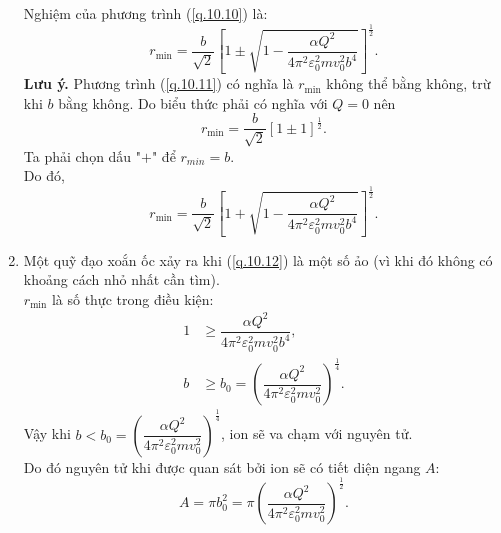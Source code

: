 \begin{loigiai}
\begin{enumerate}[1)]
    Nghiệm của phương trình (\ref{q.10.10}) là:
    \[r_{\min } = \dfrac{b}{\sqrt{2}}\left[1 \pm \sqrt{1-\dfrac{\alpha Q^{2}}{4 \pi^{2} \varepsilon_{0}^{2} m v_{0}^{2} b^{4}}}\right]^{\textstyle\frac{1}{2}}. \tag{11}\label{q.10.11}\]
    \textbf{Lưu ý.} Phương trình (\ref{q.10.11}) có nghĩa là $r_{\min}$ không thể bằng không, trừ khi $b$ bằng không.
    Do biểu thức phải có nghĩa với $Q = 0$ nên
    \[r_{\min }=\dfrac{b}{\sqrt{2}}[1 \pm 1]^{\textstyle\frac{1}{2}}.\]
    Ta phải chọn dấu "$+$" để $r_{min} = b$.\\
    Do đó,
    \[r_{\min} = \dfrac{b}{\sqrt{2}}\left[1+\sqrt{1-\dfrac{\alpha Q^{2}}{4 \pi^{2} \varepsilon_{0}^{2} m v_{0}^{2} b^{4}}}\right]^{\textstyle\frac{1}{2}}. \tag{12}\label{q.10.12} \]
    \item Một quỹ đạo xoắn ốc xảy ra khi (\ref{q.10.12}) là một số ảo (vì khi đó không có khoảng cách nhỏ nhất cần tìm).\\
    $r_{\min}$ là số thực trong điều kiện:
    \[\begin{aligned}
    1 &\geq \dfrac{\alpha Q^{2}}{4 \pi^{2} \varepsilon_{0}^{2} m v_{0}^{2} b^{4}}, \\
    b &\geq b_{0} = \left(\dfrac{\alpha Q^{2}}{4 \pi^{2} \varepsilon_{0}^{2} m v_{0}^{2}}\right)^{\textstyle\frac{1}{4}}.
    \end{aligned}\tag{13}\label{q.10.13}\]
    Vậy khi $b < b_{0} = \left(\dfrac{\alpha Q^{2}}{4 \pi^{2} \varepsilon_{0}^{2} m v_{0}^{2}}\right)^{\frac{1}{4}}$, ion sẽ va chạm với nguyên tử.\\
    Do đó nguyên tử khi được quan sát bởi ion sẽ có tiết diện ngang $A$:
    \[A = \pi b_{0}^{2}=\pi\left(\dfrac{\alpha Q^{2}}{4 \pi^{2} \varepsilon_{0}^{2} m v_{0}^{2}}\right)^{\textstyle\frac{1}{2}}. \tag{14}\label{q.10.14}\]
\end{enumerate}
\end{loigiai}


